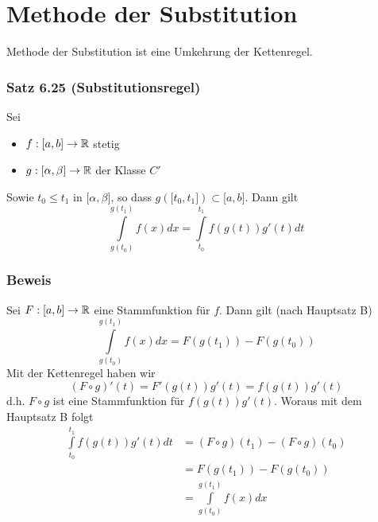 \section{Methode der Substitution}
Methode der Substitution ist eine Umkehrung der Kettenregel.
\subsubsection*{Satz 6.25 (Substitutionsregel)}
Sei
\begin{itemize}
\item $f:\lbrack a,b\rbrack\to\mathbb{R}$ stetig
\item $g:\lbrack\alpha,\beta\rbrack\to\mathbb{R}$ der Klasse $C'$
\end{itemize}
Sowie $t_0\leq t_1$ in $\lbrack\alpha,\beta\rbrack$, so dass $g\left(\lbrack t_0, t_1\rbrack\right)\subset\lbrack a,b\rbrack$.
Dann gilt
\[\int\limits_{g({t_0})}^{g({t_1})} {f(x)dx = \int\limits_{{t_0}}^{{t_1}} {f\left( {g\left( t \right)} \right)g'\left( t \right)dt} } \]

\subsubsection*{Beweis}
Sei $F:\lbrack a,b\rbrack\to\mathbb{R}$ eine Stammfunktion für $f$. Dann gilt (nach Hauptsatz B)
\[\int\limits_{g({t_0})}^{g({t_1})} {f(x)dx = F\left( {g({t_1})} \right)}  - F\left( {g({t_0})} \right)\]
Mit der Kettenregel haben wir
\[(F \circ g)'(t) = F'(g(t))g'(t) = f(g(t))g'(t)\]
d.h. $F\circ g$ ist eine Stammfunktion für $f(g(t))g'(t)$. Woraus mit dem Hauptsatz B folgt
\begin{align*}
\int\limits_{{t_0}}^{{t_1}} {f\left( {g(t)} \right)} g'(t)dt &=\left( {F \circ g} \right)({t_1}) - \left( {F \circ g} \right)({t_0})\\
 &=F\left( {g({t_1})} \right) - F\left( {g({t_0})} \right)\\
 &=\int\limits_{g({t_0})}^{g({t_1})} {f(x)dx}
\end{align*}

